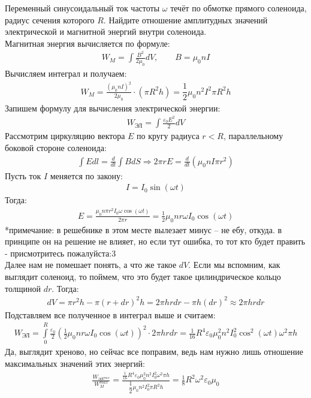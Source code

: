 \documentclass[__main__.tex]{subfiles}
\begin{document}
Переменный синусоидальный ток частоты $\omega$ течёт по обмотке прямого соленоида, радиус сечения которого $R$. Найдите отношение амплитудных значений электрической и магнитной энергий внутри соленоида.\\ 

Магнитная энергия вычисляется по формуле:
\begin{gather*}
W_M = \int \frac{B^2}{2\mu_0}dV, \qquad B = \mu_0nI
\end{gather*}
Вычисляем интеграл и получаем:
\begin{gather*}
W_M = \frac{(\mu_0nI)^2}{2\mu_0}\cdot (\pi R^2h)=\dfrac{1}{2}\mu_0 n^2I^2\pi R^2 h 
\end{gather*}
Запишем формулу для вычисления электрической энергии:
\begin{gather*}
W_{\text{ЭЛ}}= \int\frac{\varepsilon_0E^2}{2}dV
\end{gather*}
Рассмотрим циркуляцию вектора $E$ по кругу радиуса $r<R$, параллельному боковой стороне соленоида:
\begin{gather*}
\int Edl = \frac{d}{dt}\int BdS \Longrightarrow 2\pi r E = \frac{d}{dt}\left(\mu_0nI\pi r^2\right)
\end{gather*} 
Пусть ток $I$ меняется по закону:
\begin{gather*}
I=I_0\sin{(\omega t)}
\end{gather*}
Тогда:
\begin{gather*}
E = \frac{\mu_0n\pi r^2 I_0 \omega \cos{(\omega t)}}{2\pi r} = \frac{1}{2}\mu_0nr\omega I_0 \cos{(\omega t)}
\end{gather*}
*примечание: в решебнике в этом месте вылезает минус -- не ебу, откуда. в принципе он на решение не влияет, но если тут ошибка, то тот кто будет править - присмотритесь пожалуйста:3\\

Далее нам не помешает понять, а что же такое $dV$. Если мы вспомним, как выглядит соленоид, то поймем, что это будет такое цилиндрическое кольцо толщиной $dr$. Тогда:
\begin{gather*}
dV=\pi r^2h - \pi (r+dr)^2h=2\pi h r dr - \pi h (dr)^2 \approx 2\pi h r dr
\end{gather*}
Подставляем все полученное в интеграл выше и считаем:
\begin{gather*}
W_{\text{ЭЛ}}= \int\limits_0^R \frac{\varepsilon_0}{2}\left( \frac{1}{2}\mu_0nr\omega I_0 \cos{(\omega t)}\right)^2\cdot 2\pi h r dr = \frac{1}{16}R^4\varepsilon_0\mu_0^2n^2I_0^2\cos^2(\omega t)\omega^2\pi h
\end{gather*}
Да, выглядит хреново, но сейчас все поправим, ведь нам нужно лишь отношение максимальных значений этих энергий:
\begin{gather*}
\frac{W_{\text{ЭЛ}^{max}}}{W_M^{max}} = \frac{\frac{1}{16}R^4\varepsilon_0\mu_0^2n^2I_0^2\omega^2\pi h}{\dfrac{1}{2}\mu_0 n^2I_0^2\pi R^2 h } = \frac{1}{8}R^2\omega^2\varepsilon_0\mu_0
\end{gather*}
\end{document}
